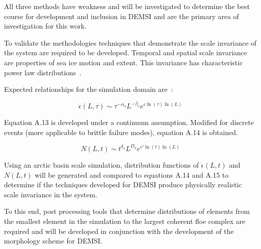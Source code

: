 All three methods have weakness and will be investigated to determine the best course for development and inclusion in \ac{DEMSI} and are the primary area of investigation for this work.

To validate the methodologies techniques that demonstrate the scale invariance of the system are required to be developed.  Temporal and spatial scale invariance are properties of sea ice motion and extent.  This invariance has characteristic power law distributions~\citet{Weiss2013}.

Expected relationships for the simulation domain are~\citet{Weiss2013}:

\begin{equation}
\dot{\epsilon}(L,\tau)\sim\tau^{-\alpha_o}L^{-\beta_o}e^{c \ln(\tau)\ln(L)} %
\end{equation}

Equation A.13 is developed under a continuum assumption.  Modified for discrete events (more applicable to brittle failure modes), equation A.14 is obtained.

\begin{equation}
N(L,t) \sim t^{\delta_o}L^{D_o}e^{c'\ln(t)\ln(L)} %
\end{equation}

Using an arctic basin scale simulation, distribution functions of $\dot{\epsilon}(L,t)$ and $N(L,t)$ will be generated and compared to equations A.14 and A.15 to determine if the techniques developed for \ac{DEMSI} produce physically realistic scale invariance in the system.

To this end, post processing tools that determine distributions of elements from the smallest element in the simulation to the largest coherent floe complex are required and will be developed in conjunction with the development of the morphology scheme for \ac{DEMSI}.
\pagebreak


